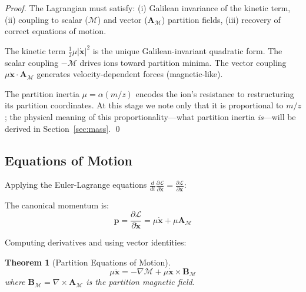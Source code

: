 \documentclass[twocolumn,10pt,a4paper]{article}
\newtheorem{theorem}{Theorem}[section]
\theoremstyle{definition}
\theoremstyle{remark}
\newcommand{\Depth}{\mathcal{M}}
\newcommand{\Lagr}{\mathcal{L}}
\newcommand{\Apartition}{\mathbf{A}_{\mathcal{M}}}
\newcommand{\partinert}{\mu}
\begin{document}
\begin{proof}
The Lagrangian must satisfy: (i) Galilean invariance of the kinetic term, (ii) coupling to scalar ($\Depth$) and vector ($\Apartition$) partition fields, (iii) recovery of correct equations of motion.

The kinetic term $\frac{1}{2}\partinert|\dot{\mathbf{x}}|^2$ is the unique Galilean-invariant quadratic form. The scalar coupling $-\Depth$ drives ions toward partition minima. The vector coupling $\partinert\dot{\mathbf{x}}\cdot\Apartition$ generates velocity-dependent forces (magnetic-like).

The partition inertia $\partinert = \alpha(m/z)$ encodes the ion's resistance to restructuring its partition coordinates. At this stage we note only that it is proportional to $m/z$; the physical meaning of this proportionality---what partition inertia \emph{is}---will be derived in Section~\ref{sec:mass}. \qed
\end{proof}

\subsection{Equations of Motion}

Applying the Euler-Lagrange equations $\frac{d}{dt}\frac{\partial\Lagr}{\partial\dot{\mathbf{x}}} = \frac{\partial\Lagr}{\partial\mathbf{x}}$:

The canonical momentum is:
\begin{equation}
    \mathbf{p} = \frac{\partial\Lagr}{\partial\dot{\mathbf{x}}} = \partinert\dot{\mathbf{x}} + \partinert\Apartition
\end{equation}

Computing derivatives and using vector identities:

\begin{theorem}[Partition Equations of Motion]
\label{thm:eom}
\begin{equation}
    \boxed{\partinert\ddot{\mathbf{x}} = -\nabla\Depth + \partinert\dot{\mathbf{x}} \times \mathbf{B}_{\Depth}}
    \label{eq:eom}
\end{equation}
where $\mathbf{B}_{\Depth} = \nabla \times \Apartition$ is the partition magnetic field.
\end{theorem}
\end{document}
